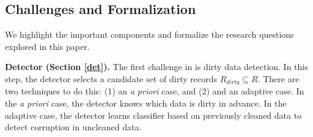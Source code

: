 \iffalse
  \subsection{Challenges and Formalization}
  We highlight the important components and formalize the research questions explored in this paper. 

  \vspace{0.5em}

  \noindent\textbf{Detector (Section \ref{det}). } The first challenge in \sys is dirty data detection. In this step, the detector selects a candidate set of dirty records $R_{dirty} \subseteq R$. There are two techniques to do this: (1) an \emph{a priori} case, and (2) and an adaptive case. In the \emph{a priori} case, the detector knows which data is dirty in advance. In the adaptive case, the detector learns classifier based on previously cleaned data to detect corruption in uncleaned data.

  \vspace{0.5em}



  \vspace{0.5em}



